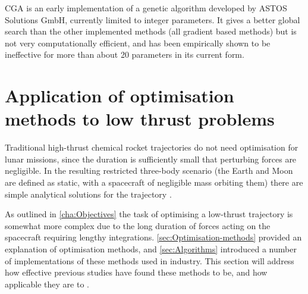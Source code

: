 CGA \parencite[Constrained Genetic Algorithm, ][]{ASTOS_guide} is an early implementation of a genetic algorithm developed by ASTOS Solutions GmbH, currently limited to integer parameters. It gives a better global search than the other implemented methods (all gradient based methods) but is not very computationally efficient, and has been empirically shown to be ineffective for more than about 20 parameters in its current form.




\section{Application of optimisation methods to low thrust problems} \label{sec:Low-thrust}




Traditional high-thrust chemical rocket trajectories do not need optimisation for lunar missions, since the duration is sufficiently small that perturbing forces are negligible. In the resulting restricted three-body scenario (the Earth and Moon are defined as static, with a spacecraft of negligible mass orbiting them) there are simple analytical solutions for the trajectory \parencite{Euler1911}.

As outlined in \autoref{cha:Objectives} the task of optimising a low-thrust trajectory is somewhat more complex due to the long duration of forces acting on the spacecraft requiring lengthy integrations. %
\autoref{sec:Optimisation-methods} provided an explanation of optimisation methods, and \autoref{sec:Algorithms} introduced a number of implementations of these methods used in industry.
This section will address how effective previous studies have found these methods to be, and how applicable they are to \BW.

